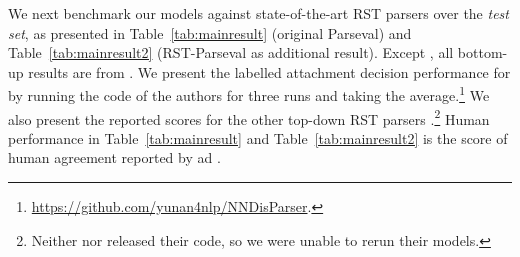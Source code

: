 \documentclass[11pt,a4paper]{article}
\newcommand{\tabref}[2][]{Table#1~\ref{tab:#2}}
\begin{document}
We next benchmark our models against state-of-the-art RST parsers over
the \textit{test set}, as presented in \tabref{mainresult} (original Parseval) and \tabref{mainresult2} (RST-Parseval as additional result).  Except \citet{yu2018transition}, all bottom-up results are from \citet{morey-etal-2017-much}. We present the labelled attachment decision performance for \citet{yu2018transition} by running the code of the authors for three runs and taking the
average.\footnote{\url{https://github.com/yunan4nlp/NNDisParser}.} We
also present the reported scores for the other top-down RST parsers
\cite{zhang-etal-2020-top,kobayashi2020top}.\footnote{Neither
  \citet{zhang-etal-2020-top} nor \citet{kobayashi2020top} released
  their code, so we were unable to rerun their models.} Human performance in \tabref{mainresult} and \tabref{mainresult2} is the score of human agreement reported by \citet{joty-etal-2015-codra} ad \citet{morey-etal-2017-much}.
\end{document}
